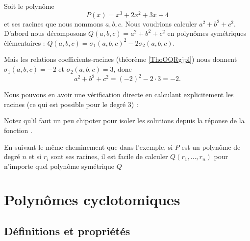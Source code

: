 
\begin{example} \label{ExHIfHhBr}
    Soit le polynôme
    \begin{equation}
        P(x)=x^3+2x^2+3x+4
    \end{equation}
    et ses racines que nous nommons \( a,b,c\). Nous voudrions calculer \( a^2+b^2+c^2\). D'abord nous décomposons \( Q(a,b,c)=a^2+b^2+c^2\) en polynômes symétriques élémentaires : \( Q(a,b,c)=\sigma_1(a,b,c)^2-2\sigma_2(a,b,c)\).

    Mais les relations coefficients-racines (théorème \ref{ThoOQRgjpl}) nous donnent \( \sigma_1(a,b,c)=-2\) et \( \sigma_2(a,b,c)=3\), donc
    \begin{equation}
        a^2+b^2+c^2=(-2)^2-2\cdot 3=-2.
    \end{equation}

    Nous pouvons en avoir une vérification directe en calculant explicitement les racines (ce qui est possible pour le degré \( 3\)) :
    

    Notez qu'il faut un peu chipoter pour isoler les solutions depuis la réponse de la fonction .

\end{example}

En suivant le même cheminement que dans l'exemple, si \( P\) est un polynôme de degré \( n\) et si \( r_i\) sont ses racines, il est facile de calculer \( Q(r_1,\ldots, r_n)\) pour n'importe quel polynôme symétrique \( Q\)


\section{Polynômes cyclotomiques}

\subsection{Définitions et propriétés}

